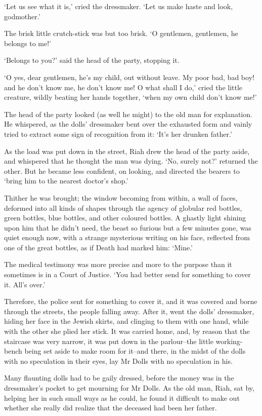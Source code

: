 ‘Let us see what it is,’ cried the dressmaker. ‘Let us make haste and
look, godmother.’

The brisk little crutch-stick was but too brisk. ‘O gentlemen,
gentlemen, he belongs to me!’

‘Belongs to you?’ said the head of the party, stopping it.

‘O yes, dear gentlemen, he’s my child, out without leave. My poor bad,
bad boy! and he don’t know me, he don’t know me! O what shall I do,’
cried the little creature, wildly beating her hands together, ‘when my
own child don’t know me!’

The head of the party looked (as well he might) to the old man for
explanation. He whispered, as the dolls’ dressmaker bent over the
exhausted form and vainly tried to extract some sign of recognition from
it: ‘It’s her drunken father.’

As the load was put down in the street, Riah drew the head of the party
aside, and whispered that he thought the man was dying. ‘No, surely
not?’ returned the other. But he became less confident, on looking, and
directed the bearers to ‘bring him to the nearest doctor’s shop.’

Thither he was brought; the window becoming from within, a wall of
faces, deformed into all kinds of shapes through the agency of globular
red bottles, green bottles, blue bottles, and other coloured bottles. A
ghastly light shining upon him that he didn’t need, the beast so furious
but a few minutes gone, was quiet enough now, with a strange mysterious
writing on his face, reflected from one of the great bottles, as if
Death had marked him: ‘Mine.’

The medical testimony was more precise and more to the purpose than it
sometimes is in a Court of Justice. ‘You had better send for something
to cover it. All’s over.’

Therefore, the police sent for something to cover it, and it was covered
and borne through the streets, the people falling away. After it,
went the dolls’ dressmaker, hiding her face in the Jewish skirts, and
clinging to them with one hand, while with the other she plied her
stick. It was carried home, and, by reason that the staircase was very
narrow, it was put down in the parlour--the little working-bench being
set aside to make room for it--and there, in the midst of the dolls with
no speculation in their eyes, lay Mr Dolls with no speculation in his.

Many flaunting dolls had to be gaily dressed, before the money was in
the dressmaker’s pocket to get mourning for Mr Dolls. As the old man,
Riah, sat by, helping her in such small ways as he could, he found it
difficult to make out whether she really did realize that the deceased
had been her father.

